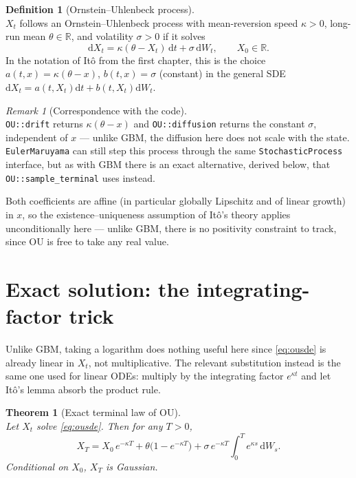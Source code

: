 \documentclass[11pt]{report}
\newcommand{\dd}{\mathrm{d}}
\newcommand{\dW}{\dd W_t}
\newcommand{\dt}{\dd t}
\newcommand{\R}{\mathbb{R}}
\newcommand{\drift}{a}
\newcommand{\diff}{b}
\theoremstyle{plain}
\newtheorem{theorem}{Theorem}[chapter]
\theoremstyle{definition}
\newtheorem{definition}{Definition}[chapter]
\theoremstyle{remark}
\newtheorem{remark}{Remark}[chapter]
\numberwithin{equation}{chapter}
\begin{document}
\begin{definition}[Ornstein--Uhlenbeck process]\label{def:ou}
  \leavevmode\\
$X_t$ follows an Ornstein--Uhlenbeck process with mean-reversion speed
$\kappa>0$, long-run mean $\theta\in\R$, and volatility $\sigma>0$ if
it solves
\begin{equation}\label{eq:ousde}
   \dd X_t = \kappa(\theta - X_t)\,\dt + \sigma\,\dW, \qquad X_0\in\R.
\end{equation}
In the notation of It\^o from the first chapter, this is the choice
$\drift(t,x)=\kappa(\theta-x)$, $\diff(t,x)=\sigma$ (constant) in the
general SDE $\dd X_t = \drift(t,X_t)\dt+\diff(t,X_t)\dW$.
\end{definition}

\begin{remark}[Correspondence with the code]
  \leavevmode\\
\texttt{OU::drift} returns $\kappa(\theta-x)$ and
\texttt{OU::diffusion} returns the constant $\sigma$, independent of
$x$ --- unlike GBM, the diffusion here does not scale with the state.
\texttt{EulerMaruyama} can still step this process through the same
\texttt{StochasticProcess} interface, but as with GBM there is an
exact alternative, derived below, that \texttt{OU::sample\_terminal}
uses instead.
\end{remark}

\noindent Both coefficients are affine (in particular globally Lipschitz and of
linear growth) in $x$, so the existence--uniqueness assumption of
It\^o's theory applies unconditionally here --- unlike
GBM, there is no positivity constraint to track, since OU is free to
take any real value.

\section{Exact solution: the integrating-factor trick}

Unlike GBM, taking a logarithm does nothing useful here since
\eqref{eq:ousde} is already linear in $X_t$, not multiplicative. The
relevant substitution instead is the same one used for linear ODEs:
multiply by the integrating factor $e^{\kappa t}$ and let It\^o's
lemma absorb the product rule.

\begin{theorem}[Exact terminal law of OU]\label{thm:ou-exact}
  \leavevmode\\
Let $X_t$ solve \eqref{eq:ousde}. Then for any $T>0$,
\begin{equation}\label{eq:ouexact}
   X_T = X_0\,e^{-\kappa T} + \theta\big(1-e^{-\kappa T}\big)
         + \sigma\, e^{-\kappa T}\!\int_0^T e^{\kappa s}\,\dd W_s .
\end{equation}
Conditional on $X_0$, $X_T$ is Gaussian.
\end{theorem}
\end{document}
